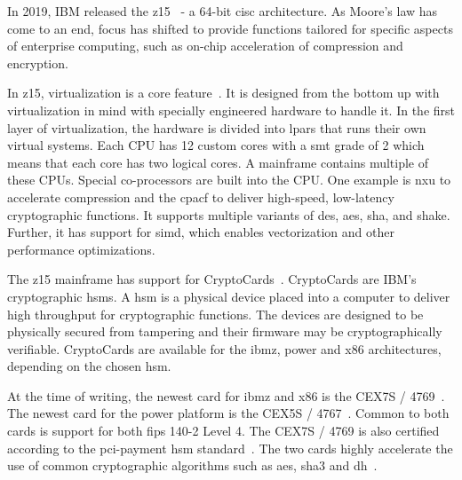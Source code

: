 In 2019, IBM released the \gls{z15}~\cite{jacobi2020} - a 64-bit \gls{cisc} architecture. As Moore's law has come to an end, focus has shifted to provide functions tailored for specific aspects of enterprise computing, such as on-chip acceleration of compression and encryption.

In \gls{z15}, virtualization is a core feature~\cite{redbook:z15}. It is designed from the bottom up with virtualization in mind with specially engineered hardware to handle it. In the first layer of virtualization, the hardware is divided into \glspl{lpar} that runs their own virtual systems. Each CPU has 12 custom cores with a \gls{smt} grade of 2 which means that each core has two logical cores. A mainframe contains multiple of these CPUs. Special co-processors are built into the CPU. One example is \gls{nxu} to accelerate compression and the \gls{cpacf} to deliver high-speed, low-latency cryptographic functions. It supports multiple variants of \gls{des}, \gls{aes}, \gls{sha}, and \gls{shake}. Further, it has support for \gls{simd}, which enables vectorization and other performance optimizations.

The \gls{z15} mainframe has support for CryptoCards~\cite{ibm:hsms}. CryptoCards are IBM's cryptographic \glspl{hsm}. A \gls{hsm} is a physical device placed into a computer to deliver high throughput for cryptographic functions. The devices are designed to be physically secured from tampering and their firmware may be cryptographically verifiable. CryptoCards are available for the \gls{ibmz}, \gls{power} and \gls{x86} architectures, depending on the chosen \gls{hsm}.

At the time of writing, the newest card for \gls{ibmz} and \gls{x86} is the CEX7S / 4769~\cite{ibm:4769}. The newest card for the \gls{power} platform is the CEX5S / 4767~\cite{ibm:4767}. Common to both cards is support for both \gls{fips} 140-2 Level 4. The CEX7S / 4769 is also certified according to the \gls{pci-payment} \gls{hsm} standard~\cite{ibm:4769,ibm:4767}. The two cards highly accelerate the use of common cryptographic algorithms such as \gls{aes}, \gls{sha3} and \gls{dh}~\cite{ibm:4767,ibm:4769}.